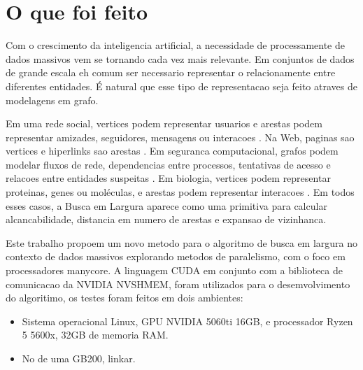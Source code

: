 \section{O que foi feito}

Com o crescimento da inteligencia artificial, a necessidade de processamente de dados massivos vem se tornando cada vez mais relevante. 
Em conjuntos de dados de grande escala eh comum ser necessario representar o relacionamente entre diferentes entidades. 
É natural que esse tipo de representacao seja feito atraves de modelagens em grafo.

Em uma rede social, vertices podem representar usuarios e arestas podem representar
amizades, seguidores, mensagens ou interacoes \cite{easleykleinberg}. Na Web,
paginas sao vertices e hiperlinks sao arestas \cite{brinpage}. Em seguranca
computacional, grafos podem modelar fluxos de rede, dependencias entre
processos, tentativas de acesso e relacoes entre entidades suspeitas
\cite{akoglugraphanomaly}. Em biologia, vertices podem representar proteinas,
genes ou moléculas, e arestas podem representar interacoes
\cite{barabasinetworkbiology}. Em todos esses casos, a Busca em Largura aparece como uma
primitiva para calcular alcancabilidade, distancia em numero de arestas e
expansao de vizinhanca.


Este trabalho propoem um novo metodo para o algoritmo de busca em largura no
contexto de dados massivos explorando metodos de paralelismo, com o foco em processadores manycore.  A linguagem CUDA em conjunto com a biblioteca de comunicacao da NVIDIA NVSHMEM,
foram utilizados para o desemvolvimento do algoritimo, os testes foram feitos em dois ambientes:
\begin{itemize}
\item Sistema operacional Linux, GPU NVIDIA 5060ti 16GB, e processador Ryzen 5 5600x, 32GB de memoria RAM.
\item No de uma GB200, linkar. 
\end{itemize}

